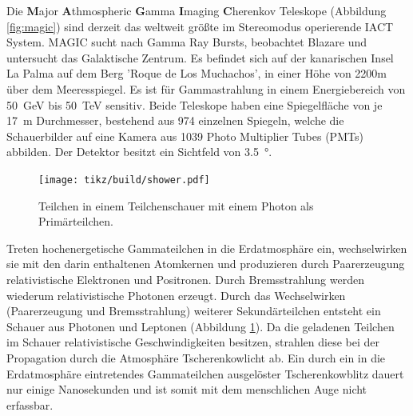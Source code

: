 

Die \textbf{M}ajor \textbf{A}thmospheric \textbf{G}amma \textbf{I}maging
\textbf{C}herenkov Teleskope (Abbildung \ref{fig:magic}) sind derzeit das
weltweit größte im Stereomodus operierende IACT System.
MAGIC sucht nach Gamma Ray Bursts, beobachtet Blazare und untersucht das
Galaktische Zentrum.
Es befindet sich auf der kanarischen Insel La Palma auf dem Berg 'Roque de Los Muchachos',
in einer Höhe von 2200m über dem Meeresspiegel.
Es ist für Gammastrahlung in einem Energiebereich von
\SI{50}{\giga\electronvolt} bis \SI{50}{\tera\electronvolt} sensitiv.
Beide Teleskope haben eine Spiegelfläche von je \SI{17}{\meter} Durchmesser,
bestehend aus 974 einzelnen Spiegeln,
welche die Schauerbilder auf eine Kamera aus 1039 Photo Multiplier Tubes (PMTs) abbilden.
Der Detektor besitzt ein Sichtfeld von \SI{3,5}{\degree}.

\begin{figure}
		\texttt{[image: tikz/build/shower.pdf]}
		\caption{Teilchen in einem Teilchenschauer mit einem Photon als
    Pri\-mär\-teil\-chen.}%
    \label{fig:schauer}
\end{figure}
Treten hochenergetische Gammateilchen in die Erdatmosphäre ein,
wechselwirken sie mit den darin enthaltenen Atomkernen
und produzieren durch Paarerzeugung relativistische Elektronen
und Positronen.
Durch Bremsstrahlung werden wiederum relativistische Photonen erzeugt.
Durch das Wechselwirken (Paarerzeugung und Bremsstrahlung) weiterer
Sekundärteilchen entsteht ein Schauer aus Photonen und Leptonen (Abbildung
\ref{fig:schauer}).
Da die geladenen Teilchen im Schauer relativistische Geschwindigkeiten besitzen,
strahlen diese bei der Propagation durch die Atmosphäre Tscherenkowlicht ab.
Ein durch ein in die Erdatmosphäre eintretendes Gammateilchen ausgelöster
Tscherenkowblitz dauert nur einige Nanosekunden
und ist somit mit dem menschlichen Auge nicht erfassbar.


